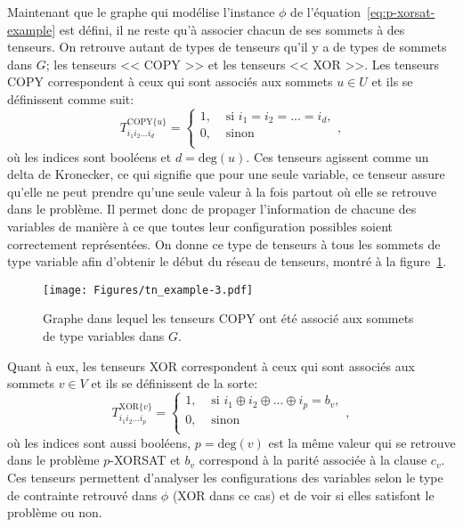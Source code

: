 Maintenant que le graphe qui modélise l'instance $\phi$ de l'équation~\ref{eq:p-xorsat-example} est défini, il ne reste qu'à associer chacun de ses sommets à des tenseurs.
On retrouve autant de types de tenseurs qu'il y a de types de sommets dans $G$; les tenseurs << COPY >> et les tenseurs << XOR >>.
Les tenseurs COPY correspondent à ceux qui sont associés aux sommets $u \in U$ et ils se définissent comme suit:
\begin{equation}\label{eq:COPY}
    T^{\text{COPY}\{u\}}_{i_1i_2...i_d} = \begin{cases}
        1, & \text{ si } i_1 = i_2 = ... = i_d,\\
        0, & \text{ sinon}\\
    \end{cases},
\end{equation}
où les indices sont booléens et $d = \mathrm{deg}(u)$.
Ces tenseurs agissent comme un delta de Kronecker, ce qui signifie que pour une seule variable, ce tenseur assure qu'elle ne peut prendre qu'une seule valeur à la fois partout où elle se retrouve dans le problème.
Il permet donc de propager l'information de chacune des variables de manière à ce que toutes leur configuration possibles soient correctement représentées.
On donne ce type de tenseurs à tous les sommets de type variable afin d'obtenir le début du réseau de tenseurs, montré à la figure~\ref{fig:tn-example3}.
\begin{figure}[h]
    \centering
    \texttt{[image: Figures/tn\_example-3.pdf]}
    \caption{Graphe dans lequel les tenseurs COPY ont été associé aux sommets de type variables dans $G$.}
    \label{fig:tn-example3}
\end{figure}
Quant à eux, les tenseurs XOR correspondent à ceux qui sont associés aux sommets $v \in V$ et ils se définissent de la sorte:
\begin{equation} \label{eq:XOR-tensor}
    T^{\text{XOR}\{v\}}_{i_1i_2...i_p} = \begin{cases}
        1, & \text{ si } i_1 \oplus i_2 \oplus ... \oplus i_p = b_v,\\
        0, & \text{ sinon}\\
    \end{cases},
\end{equation}
où les indices sont aussi booléens, $p = \mathrm{deg}(v)$ est la même valeur qui se retrouve dans le problème $p$-XORSAT et $b_v$ correspond à la parité associée à la clause $c_v$.
Ces tenseurs permettent d'analyser les configurations des variables selon le type de contrainte retrouvé dans $\phi$ (XOR dans ce cas) et de voir si elles satisfont le problème ou non.
